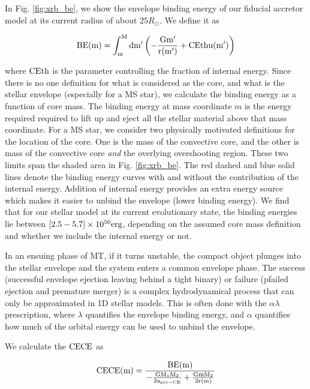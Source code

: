 \documentclass[linenumbers,trackchanges,twocolumn]{aastex701}
\begin{document}
In Fig. \ref{fig:xrb_be}, we show the envelope binding energy of our fiducial accretor model at its current radius of about $25R_{\odot}$. We define it as 

\begin{equation}
    \rm BE(m) = \int_m^M dm' \left(-\frac{Gm'}{r(m')} + \alpha_{\rm th}u(m')\right)
\end{equation}

where $\alpha_{\rm th}$ is the parameter controlling the fraction of internal energy. Since there is no one definition for what is considered as the core, and what is the stellar envelope (especially for a MS star), we calculate the binding energy as a function of core mass. The binding energy at mass coordinate $m$ is the energy required required to lift up and eject all the stellar material above that mass coordinate. For a MS star, we consider two physically motivated definitions for the location of the core. One is the mass of the convective core, and the other is mass of the convective core \textit{and} the overlying overshooting region. These two limits span the shaded area in Fig. \ref{fig:xrb_be}. The red dashed and blue solid lines denote the binding energy curves with and without the contribution of the internal energy. Addition of internal energy provides an extra energy source which makes it easier to unbind the envelope (lower binding energy). We find that for our stellar model at its current evolutionary state, the binding energies lie between $[2.5-5.7] \times 10^{50} \rm erg$, depending on the assumed core mass definition and whether we include the internal energy or not. 

In an ensuing phase of MT, if it turns unstable, the compact object plunges into the stellar envelope and the system enters a common envelope phase. The success (successful envelope ejection leaving behind a tight binary) or failure (pfailed ejection and premature merger) is a complex hydrodynamical process that can only be approximated in 1D stellar models. This is often done with the $\alpha \lambda$ prescription, where $\lambda$ quantifies the envelope binding energy, and $\alpha$ quantifies how much of the orbital energy can be used to unbind the envelope. 

We calculate the $\alpha_{\rm CE}$ as

\begin{equation}
    \alpha_{\rm CE} \def \alpha_{\rm CE}(m) = \frac{\rm BE(m)}{-\frac{\rm GM_1 M_2}{2a_{\rm pre-CE}} + \frac{\rm Gm M_2}{2r(m)}}
\end{equation}
\end{document}

